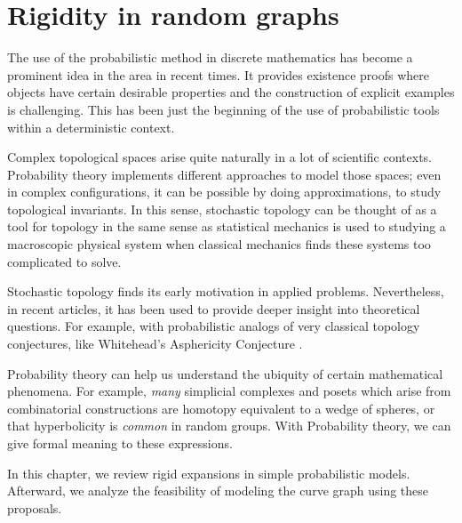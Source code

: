 
\chapter{Rigidity in random graphs} %

\label{Chapter2} %



The use of the probabilistic method in discrete mathematics has become a prominent idea in the area in recent times. It provides existence proofs where objects have certain desirable properties and the construction of explicit examples is challenging. This has been just the beginning of the use of probabilistic tools within a deterministic context.

Complex topological spaces arise quite naturally in a lot of scientific contexts. Probability theory implements different approaches to model those spaces; even in complex configurations, it can be possible by doing approximations, to study topological invariants. In this sense, stochastic topology can be thought of as a tool for topology in the same sense as statistical mechanics is used to studying a macroscopic physical system when classical mechanics finds these systems too complicated to solve. 

Stochastic topology finds its early motivation in applied problems. Nevertheless, in recent articles, it has been used to provide deeper insight into theoretical questions. For example, with probabilistic analogs of very classical topology conjectures, like Whitehead's Asphericity Conjecture \cite[Costa, Faber 15]{Costa15}.

Probability theory can help us understand the ubiquity of certain mathematical phenomena. For example, \textit{many} simplicial complexes and posets which arise from combinatorial constructions are homotopy equivalent to a wedge of spheres, or that hyperbolicity is \textit{common} in random groups. With Probability theory, we can give formal meaning to these expressions.

In this chapter, we review rigid expansions in simple probabilistic models. Afterward, we analyze the feasibility of modeling the curve graph using these proposals.

